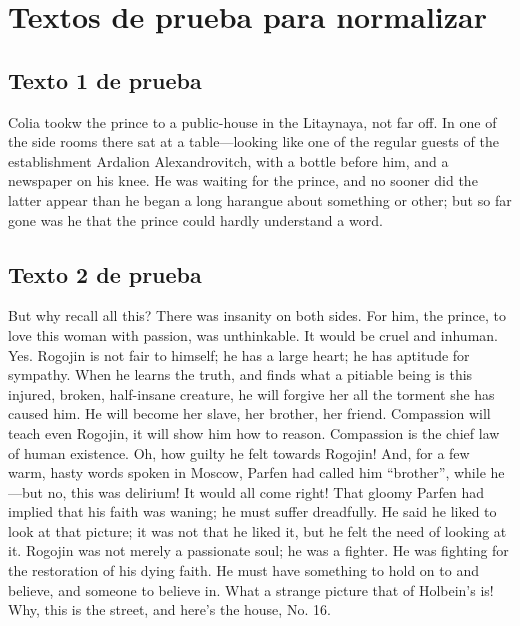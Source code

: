 \documentclass[a4paper,twocolumn]{article}
\begin{document}
    \appendix


    \section{Textos de prueba para normalizar}\label{sec:textosAnormalizar} \label{app:a}

    \subsection{Texto 1 de prueba}\label{subsec:texto1}
    Colia tookw the prince to a public-house in the Litaynaya, not far off.
    In one of the side rooms there sat at a table—looking like one of the
    regular guests of the establishment Ardalion Alexandrovitch, with a
    bottle before him, and a newspaper on his knee.
    He was waiting for the
    prince, and no sooner did the latter appear than he began a long
    harangue about something or other; but so far gone was he that the
    prince could hardly understand a word.

    \subsection{Texto 2 de prueba}\label{subsec:texto2}
    But why recall all this?
    There was insanity on both sides.
    For him, the
    prince, to love this woman with passion, was unthinkable.
    It would be
    cruel and inhuman.
    Yes.
    Rogojin is not fair to himself; he has a large
    heart; he has aptitude for sympathy.
    When he learns the truth, and
    finds what a pitiable being is this injured, broken, half-insane
    creature, he will forgive her all the torment she has caused him.
    He
    will become her slave, her brother, her friend.
    Compassion will teach
    even Rogojin, it will show him how to reason.
    Compassion is the chief
    law of human existence.
    Oh, how guilty he felt towards Rogojin!
    And,
    for a few warm, hasty words spoken in Moscow, Parfen had called him
    ``brother'', while he—but no, this was delirium!
    It would all come right!
    That gloomy Parfen had implied that his faith was waning; he must
    suffer dreadfully.
    He said he liked to look at that picture; it was not
    that he liked it, but he felt the need of looking at it.
    Rogojin was
    not merely a passionate soul; he was a fighter.
    He was fighting for the
    restoration of his dying faith.
    He must have something to hold on to
    and believe, and someone to believe in.
    What a strange picture that of
    Holbein’s is!
    Why, this is the street, and here’s the house, No. 16.
\end{document}
